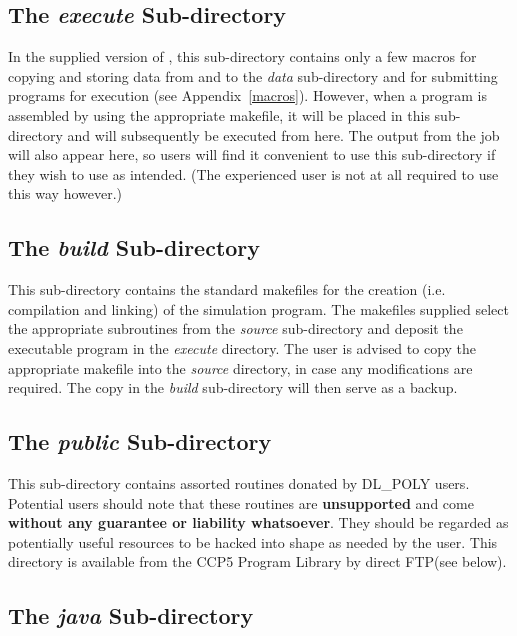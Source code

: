 \subsection{The {\em execute} Sub-directory}

In the supplied version of \D, this sub-directory contains only a
few macros for copying and storing data from and to the {\em data}
sub-directory and for submitting programs for execution (see
Appendix~\ref{macros}).  However, when a \D program is assembled
by using the appropriate makefile, it will be placed in this
sub-directory and will subsequently be executed from here.
The output from the job will also appear here, so users will
find it convenient to use this sub-directory if they wish to
use \D as intended.  (The experienced user is not at all
required to use \D this way however.)

\subsection{The {\em build} Sub-directory}

This sub-directory contains the standard makefiles for the
creation (i.e. compilation and linking) of the \D simulation
program.  The makefiles supplied select the appropriate
subroutines from the {\em source} sub-directory and deposit the
executable program in the {\em execute} directory.  The user is
advised to copy the appropriate makefile into the {\em source}
directory, in case any modifications are required.  The copy in
the {\em build} sub-directory will then serve as a backup.

\subsection{The {\em public} Sub-directory}

This sub-directory contains assorted routines donated by DL\_POLY
users.  Potential users should note that these routines are {\bf
unsupported} and come {\bf without any guarantee or liability
whatsoever}.  They should be regarded as potentially useful
resources to be hacked into shape as needed by the user.  This
directory is available from the CCP5 Program Library
by direct FTP(see below).

\subsection{The {\em java} Sub-directory}

